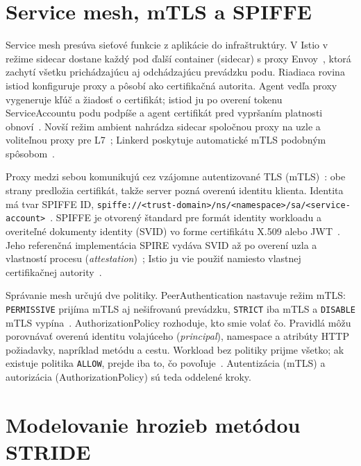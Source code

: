 \section{Service mesh, mTLS a SPIFFE}
\label{sec:mesh}

Service mesh presúva sieťové funkcie z aplikácie do infraštruktúry. V Istio v režime sidecar dostane každý pod ďalší container (sidecar) s proxy Envoy~\cite{envoy}, ktorá zachytí všetku prichádzajúcu aj odchádzajúcu prevádzku podu. Riadiaca rovina istiod konfiguruje proxy a pôsobí ako certifikačná autorita. Agent vedľa proxy vygeneruje kľúč a žiadosť o certifikát; istiod ju po overení tokenu ServiceAccountu podu podpíše a agent certifikát pred vypršaním platnosti obnoví~\cite{istio-security}. Novší režim ambient nahrádza sidecar spoločnou proxy na uzle a voliteľnou proxy pre L7~\cite{istio-ambient}; Linkerd poskytuje automatické mTLS podobným spôsobom~\cite{linkerd-mtls}.

Proxy medzi sebou komunikujú cez vzájomne autentizované TLS (mTLS)~\cite{rfc8446}: obe strany predložia certifikát, takže server pozná overenú identitu klienta. Identita má tvar SPIFFE ID, \nolinkurl{spiffe://<trust-domain>/ns/<namespace>/sa/<service-account>}~\cite{spiffe-id}. SPIFFE je otvorený štandard pre formát identity workloadu a overiteľné dokumenty identity (SVID) vo forme certifikátu X.509 alebo JWT~\cite{spiffe-overview}. Jeho referenčná implementácia SPIRE vydáva SVID až po overení uzla a vlastností procesu (\emph{attestation})~\cite{spire-concepts}; Istio ju vie použiť namiesto vlastnej certifikačnej autority~\cite{istio-spire}.

Správanie mesh určujú dve politiky. PeerAuthentication nastavuje režim mTLS: \texttt{PERMISSIVE} prijíma mTLS aj nešifrovanú prevádzku, \texttt{STRICT} iba mTLS a \texttt{DISABLE} mTLS vypína~\cite{istio-peerauthentication}. AuthorizationPolicy rozhoduje, kto smie volať čo. Pravidlá môžu porovnávať overenú identitu volajúceho (\emph{principal}), namespace a atribúty HTTP požiadavky, napríklad metódu a cestu. Workload bez politiky prijme všetko; ak existuje politika \texttt{ALLOW}, prejde iba to, čo povoľuje~\cite{istio-authorizationpolicy}. Autentizácia (mTLS) a autorizácia (AuthorizationPolicy) sú teda oddelené kroky.

\section{Modelovanie hrozieb metódou STRIDE}
\label{sec:stride}

